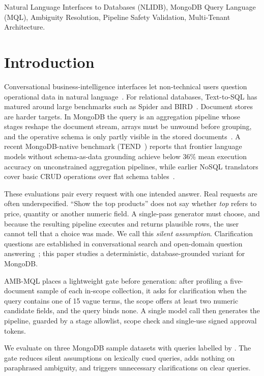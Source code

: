 \begin{IEEEkeywords}
Natural Language Interfaces to Databases (NLIDB), MongoDB Query Language (MQL), Ambiguity Resolution, Pipeline Safety Validation, Multi-Tenant Architecture.
\end{IEEEkeywords}

\section{Introduction}
Conversational business-intelligence interfaces let non-technical users question operational data in natural language~\cite{setlur2016eviza,fast2018iris,quamar2022nli}. For relational databases, Text-to-SQL has matured around large benchmarks such as Spider and BIRD~\cite{spider2018,bird2023}. Document stores are harder targets. In MongoDB the query is an aggregation pipeline whose stages reshape the document stream, arrays must be unwound before grouping, and the operative schema is only partly visible in the stored documents~\cite{mongodb2024manual,tend2025benchmark}. A recent MongoDB-native benchmark (TEND~\cite{tend2025benchmark}) reports that frontier language models without schema-as-data grounding achieve below 36\% mean execution accuracy on unconstrained aggregation pipelines, while earlier NoSQL translators cover basic CRUD operations over flat schema tables~\cite{hossen2023bert}.

These evaluations pair every request with one intended answer. Real requests are often underspecified. ``Show the top products'' does not say whether \emph{top} refers to price, quantity or another numeric field. A single-pass generator must choose, and because the resulting pipeline executes and returns plausible rows, the user cannot tell that a choice was made. We call this \emph{silent assumption}. Clarification questions are established in conversational search and open-domain question answering~\cite{aliannejadi2019asking,zamani2020generating,min2020ambigqa}; this paper studies a deterministic, database-grounded variant for MongoDB.

AMB-MQL places a lightweight gate before generation: after profiling a five-document sample of each in-scope collection, it asks for clarification when the query contains one of 15 vague terms, the scope offers at least two numeric candidate fields, and the query binds none. A single model call then generates the pipeline, guarded by a stage allowlist, scope check and single-use signed approval tokens.

We evaluate on three MongoDB sample datasets with \numTotalQueries{} queries labelled by \numAnnotators{}. The gate reduces silent assumptions on lexically cued queries, adds nothing on paraphrased ambiguity, and triggers unnecessary clarifications on clear queries.

